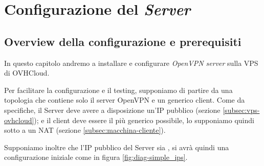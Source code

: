 \chapter{Configurazione del \textit{Server} \ok}
\label{ch:server}

\section{Overview della configurazione e prerequisiti \ok}
\label{sec:overview_server}

In questo capitolo andremo a installare e configurare \textit{OpenVPN server} sulla VPS di OVHCloud.

Per facilitare la configurazione e il testing, supponiamo di partire da una topologia che contiene solo il server OpenVPN e un generico client. Come da specifiche, il Server deve avere a disposizione un'IP pubblico (sezione \ref{subsec:vps-ovhcloud}); e il client deve essere il più generico possibile, lo supponiamo quindi sotto a un NAT (sezione \ref{subsec:macchina-cliente}).


Supponiamo inoltre che l'IP pubblico del Server sia , si avrà quindi una configurazione iniziale come in figura \ref{fig:diag-simple_ips}.


